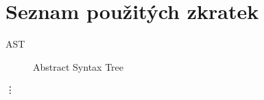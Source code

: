 \chapter{Seznam použitých zkratek}

\begin{description}
\item[AST] Abstract Syntax Tree
\end{description}
\vdots
